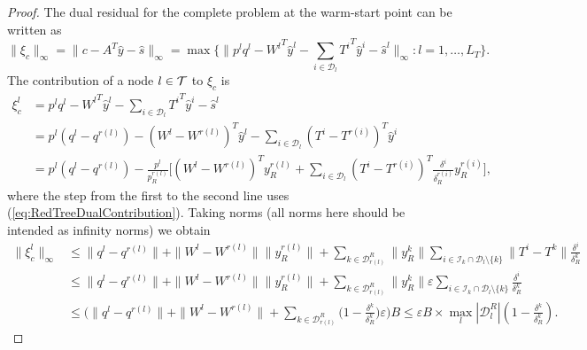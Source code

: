 \begin{proof}
The dual residual for the complete problem at the warm-start point 
can be written as
\[
  \|\xi_c\|_\infty = \|c -A^T\hat y -\hat s \|_\infty 
                   = \max\{\|p^{l}q^{l}
                   - {W^{l}}^T\hat y^{l} 
                   - \sum_{i \in \mathcal{D}_{l}} {T^{i}}^T\hat y^{i}
                   - \hat s^{l}
  \|_\infty : l = 1,\ldots,L_T\}.
\]
%
The contribution of a node $l \in \mathcal{T}$ to $\xi_c$ is
\[
\begin{split}
  \xi_c^{l} 
 & = p^{l} q^{l} - {W^{l}}^T\hat y^{l}
     - \sum_{i\in \mathcal{D}_{l}} {T^i}^T \!\hat y^{i} -\hat s^{l} \\
 & = p^{l}(q^{l}\!-\! q^{r(l)})
     - (W^{l} \!-\! W^{r(l)})^T \hat y^{l}
     -\sum_{i \in \mathcal{D}_{l}} (T^{i} \!-\! T^{r(i)})^T\hat y^i \\
 & = p^{l}(q^{l} \!-\! q^{r(l)})
     - \frac{p^{l}}{p^{r(l)}_R} \Big[
       (W^{l} \!-\! W^{r(l)})^T y^{r(l)}_R
       +\sum_{i\in \mathcal{D}_{l}} %
           (T^{i} \!-\! T^{r(i)})^T 
           \frac{\delta^i}{\delta^{r(i)}_R} y^{r(i)}_R \Big],
\end{split}
\]
where the step from the first to the second line uses 
(\ref{eq:RedTreeDualContribution}).
%
Taking norms (all norms here should be intended as infinity norms)
we obtain
\[
\begin{split}
  \| \xi_c^{l} \|_\infty
  & \le \|q^{l} - q^{r(l)}\| 
        + \|W^{l} - W^{r(l)}\| \| y^{r(l)}_R\|
        + \!\!\! \sum_{k\in \mathcal{D}_{r(l)}^R} \!\!\! \| y^{k}_R \| \!\!
          \sum_{i\in \mathcal{I}_k \cap \mathcal{D}_{l}\setminus \{k\} }
	  \!\!\! \| T^{i} - T^{k} \| \frac{\delta^i}{\delta_R^k} \\
  & \le \|q^{l} - q^{r(l)}\| 
        + \|W^{l} - W^{r(l)}\| \| y^{r(l)}_R\|
        + \!\!\! \sum_{k\in \mathcal{D}_{r(l)}^R} \!\!\! \| y^{k}_R \|
          \varepsilon \!\!
          \sum_{i\in \mathcal{I}_k \cap \mathcal{D}_{l}\setminus \{k\} }
	  \! \frac{\delta^i}{\delta_R^k} \\
  & \le \Big( \|q^{l} - q^{r(l)}\| 
        + \|W^{l} - W^{r(l)}\|
        + \sum_{k\in \mathcal{D}_{r(l)}^R}
	  \big( 1 - \frac{\delta^k}{\delta_R^k} \big) \varepsilon \Big) B 
   \le \varepsilon B\times 
        \max_{l} |\mathcal{D}_{l}^R| (1 - \frac{\delta^k}{\delta^k_R}).
\end{split}
\]
%
\end{proof}

